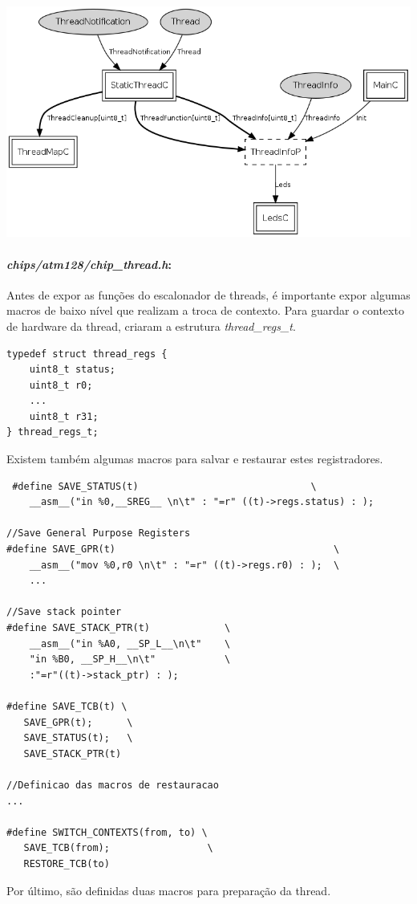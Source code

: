 \includegraphics[scale=0.5]{images/tos-lib-tosthreads-system-ThreadC.png}

\paragraph{\textit{chips/atm128/chip\_thread.h}:}
Antes de expor as funções do escalonador de threads, é importante expor algumas macros de baixo nível que realizam a
troca de contexto. Para guardar o contexto de hardware da thread, criaram a estrutura \textit{thread\_regs\_t}.
\begin{lstlisting}
typedef struct thread_regs {
    uint8_t status;
    uint8_t r0;
    ...
    uint8_t r31;
} thread_regs_t;
\end{lstlisting}
Existem também algumas macros para salvar e restaurar estes registradores.
\begin{lstlisting}
 #define SAVE_STATUS(t)                              \
    __asm__("in %0,__SREG__ \n\t" : "=r" ((t)->regs.status) : );

//Save General Purpose Registers
#define SAVE_GPR(t)                                      \
    __asm__("mov %0,r0 \n\t" : "=r" ((t)->regs.r0) : );  \
    ...

//Save stack pointer
#define SAVE_STACK_PTR(t)             \
    __asm__("in %A0, __SP_L__\n\t"    \
    "in %B0, __SP_H__\n\t"            \
    :"=r"((t)->stack_ptr) : );

#define SAVE_TCB(t) \
   SAVE_GPR(t);      \
   SAVE_STATUS(t);   \
   SAVE_STACK_PTR(t) 

//Definicao das macros de restauracao
...

#define SWITCH_CONTEXTS(from, to) \
   SAVE_TCB(from);                 \
   RESTORE_TCB(to)
\end{lstlisting}
Por último, são definidas duas macros para preparação da thread.
